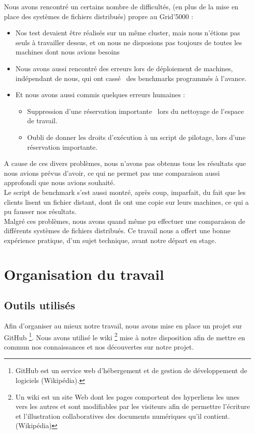 \documentclass[12pt]{report}
\begin{document}
	Nous avons rencontré un certains nombre de difficultés, (en plus de la mise en place des systèmes de fichiers distribués) propre au Grid'5000 :
	\begin{itemize}
		\item Nos test devaient être réalisés sur un même cluster, mais nous n'étions pas seuls à travailler dessus,
		et on nous ne disposions pas toujours de toutes les machines dont nous avions besoins
		\item Nous avons aussi rencontré des erreurs lors de déploiement de machines, indépendant de nous, qui ont \og cassé\fg~ des benchmarks programmés à l'avance.
		\item Et nous avons aussi commis quelques erreurs humaines :
		\begin{itemize}
			\item Suppression d'une réservation \og importante\fg~ lors du nettoyage de l'espace de travail.
			\item Oubli de donner les droits d'exécution à un script de pilotage, lors d'une réservation \og importante\fg.\\
		\end{itemize}
	\end{itemize}

	A cause de ces divers problèmes, nous n'avons pas obtenus tous les résultats que nous avions prévus d'avoir, ce qui ne permet pas une comparaison aussi approfondi
	que nous avions souhaité.\\

	Le script de benchmark s'est aussi montré, après coup, imparfait, du fait que les clients lisent un fichier distant, dont ils ont une copie sur leurs machines,
	ce qui a pu fausser nos résultats.\\

	Malgré ces problèmes, nous avons quand même pu effectuer une comparaison de différents systèmes de fichiers distribués.
	Ce travail nous a offert une bonne expérience pratique, d'un sujet technique, avant notre départ en stage.

	\appendix
		\chapter{Organisation du travail}
			\section{Outils utilisés}
				Afin d'organiser au mieux notre travail, nous avons mise en place un projet sur GitHub
				\footnote{GitHub est un service web d'hébergement et de gestion de développement de logiciels (Wikipédia).}.
				Nous avons utilisé le wiki
				\footnote{Un wiki est un site Web dont les pages comportent des hyperliens les unes vers les autres
				et sont modifiables par les visiteurs afin de permettre l'écriture et l'illustration collaboratives des documents numériques qu'il contient. (Wikipédia)}
				mise à notre disposition afin de mettre en commun nos connaissances et nos découvertes sur notre projet.
\end{document}
